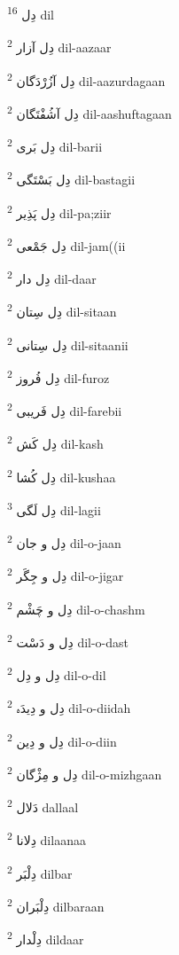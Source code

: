 \documentclass[12pt]{article}
\begin{document}
\begin{multicols}{5}
{\ur دِل}   \textsuperscript{16} dil

{\ur دِل آزار}   \textsuperscript{2} dil-aazaar

{\ur دِل آزُرْدَگان}   \textsuperscript{2} dil-aazurdagaan

{\ur دِل آشُفْتَگان}   \textsuperscript{2} dil-aashuftagaan

{\ur دِل بَری}   \textsuperscript{2} dil-barii

{\ur دِل بَسْتَگی}   \textsuperscript{2} dil-bastagii

{\ur دِل پَذِیر}   \textsuperscript{2} dil-pa;ziir

{\ur دِل جَمْعی}   \textsuperscript{2} dil-jam((ii

{\ur دِل دار}   \textsuperscript{2} dil-daar

{\ur دِل سِتان}   \textsuperscript{2} dil-sitaan

{\ur دِل سِتانی}   \textsuperscript{2} dil-sitaanii

{\ur دِل فُروز}   \textsuperscript{2} dil-furoz

{\ur دِل فَریبی}   \textsuperscript{2} dil-farebii

{\ur دِل کَش}   \textsuperscript{2} dil-kash

{\ur دِل کُشا}   \textsuperscript{2} dil-kushaa

{\ur دِل لَگی}   \textsuperscript{3} dil-lagii

{\ur دِل و جان}   \textsuperscript{2} dil-o-jaan

{\ur دِل و جِگَر}   \textsuperscript{2} dil-o-jigar

{\ur دِل و چَشْم}   \textsuperscript{2} dil-o-chashm

{\ur دِل و دَسْت}   \textsuperscript{2} dil-o-dast

{\ur دِل و دِل}   \textsuperscript{2} dil-o-dil

{\ur دِل و دِیدَہ}   \textsuperscript{2} dil-o-diidah

{\ur دِل و دِین}   \textsuperscript{2} dil-o-diin

{\ur دِل و مِژْگان}   \textsuperscript{2} dil-o-mizhgaan

{\ur دَلال}   \textsuperscript{2} dallaal

{\ur دِلانا}   \textsuperscript{2} dilaanaa

{\ur دِلْبَر}   \textsuperscript{2} dilbar

{\ur دِلْبَران}   \textsuperscript{2} dilbaraan

{\ur دِلْدار}   \textsuperscript{2} dildaar


\end{multicols}
\end{document}
